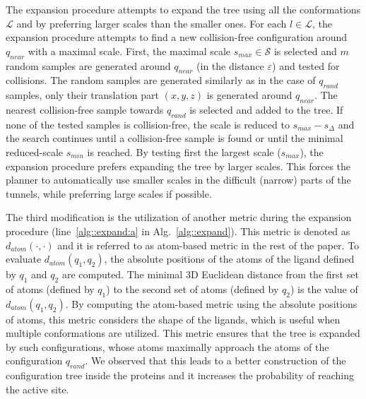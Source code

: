 \documentclass[usletter, 10pt, conference]{ieeeconf} %
\def\qrand{q_{rand}}
\def\qnear{q_{near}}
\def\da{d_{atom}}
\def\smin{s_{min}}
\def\smax{s_{max}}
\def\sdelta{s_{\Delta}}
\def\L{\mathcal{L}}
\def\S{\mathcal{S}}
\begin{document}
The expansion procedure attempts to expand the tree using all the conformations $\L$ and by preferring larger scales than the smaller ones.
For each $l \in \L$, the expansion procedure attempts to find a new collision-free configuration around $\qnear$ with a maximal scale.
First, the maximal scale $\smax \in \S$ is selected and $m$ random samples are generated around $\qnear$ (in the distance $\varepsilon$) 
and tested for collisions.
The random samples are generated similarly as in the case of $\qrand$ samples, only their translation
part $(x,y,z)$ is generated around $\qnear$.
The nearest collision-free sample towards $\qrand$ is selected and added to the tree.
If none of the tested samples is collision-free, the scale is reduced to $\smax-\sdelta$ and the search continues
until a collision-free sample is found or until the minimal reduced-scale $\smin$ is reached.
By testing first the largest scale ($\smax$), the expansion procedure prefers expanding the tree by larger scales.
This forces the planner to automatically use smaller scales in the difficult (narrow) parts of the tunnels, while preferring
large scales if possible.

The third modification is the utilization of another metric during the expansion procedure (line~\ref{alg::expand:a} in Alg.~\ref{alg::expand}).
This metric is denoted as $\da(\cdot,\cdot)$ and it is referred to as atom-based metric in the rest of the paper.
To evaluate $\da(q_1,q_2)$, the absolute positions of the atoms of the ligand defined by $q_1$ and $q_2$ are computed.
The minimal 3D Euclidean distance from the first set of atoms (defined by $q_1$) to the second set of atoms (defined by $q_2$) is the value of 
$\da(q_1,q_2)$.
By computing the atom-based metric using the absolute positions of atoms, this metric considers the shape of the ligands, which
is useful when multiple conformations are utilized.
This metric ensures that the tree is expanded by such configurations, whose atoms maximally approach
the atoms of the configuration $\qrand$.
We observed that this leads to a better construction of the configuration tree inside the proteins and it increases the probability
of reaching the active site.

\end{document}
